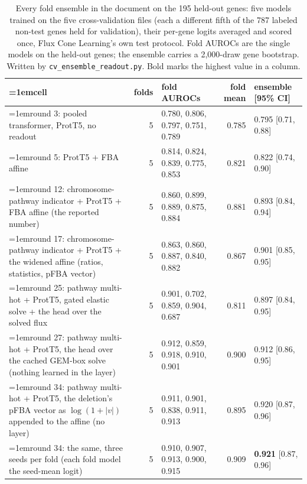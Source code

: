 \begin{table}[H]
  \centering
  \footnotesize
  \setlength{\tabcolsep}{2.5pt}
  \caption[Fold ensembles]{Every fold ensemble in the document on the 195 held-out genes: five models trained on the five cross-validation files (each a different fifth of the 787 labeled non-test genes held for validation), their per-gene logits averaged and scored once, Flux Cone Learning's own test protocol. Fold AUROCs are the single models on the held-out genes; the ensemble carries a 2,000-draw gene bootstrap. Written by \texttt{cv\_ensemble\_readout.py}. Bold marks the highest value in a column.}
  \label{tab:ensembles}
  \begin{tabular}{@{}>{\raggedright\hangindent=1em\hangafter=1\arraybackslash}p{88.6mm}rlrl@{}}
    \hline
    cell & folds & fold AUROCs & fold mean & ensemble [95\% CI] \\
    \hline
    round 3: pooled transformer, ProtT5, no readout & 5 & 0.780, 0.806, 0.797, 0.751, 0.789 & 0.785 & 0.795 [0.71, 0.88] \\
    round 5: ProtT5 + FBA affine & 5 & 0.814, 0.824, 0.839, 0.775, 0.853 & 0.821 & 0.822 [0.74, 0.90] \\
    round 12: chromosome-pathway indicator + ProtT5 + FBA affine (the reported number) & 5 & 0.860, 0.899, 0.889, 0.875, 0.884 & 0.881 & 0.893 [0.84, 0.94] \\
    round 17: chromosome-pathway indicator + ProtT5 + the widened affine (ratios, statistics, pFBA vector) & 5 & 0.863, 0.860, 0.887, 0.840, 0.882 & 0.867 & 0.901 [0.85, 0.95] \\
    round 25: pathway multi-hot + ProtT5, gated elastic solve + the head over the solved flux & 5 & 0.901, 0.702, 0.859, 0.904, 0.687 & 0.811 & 0.897 [0.84, 0.95] \\
    round 27: pathway multi-hot + ProtT5, the head over the cached GEM-box solve (nothing learned in the layer) & 5 & 0.912, 0.859, 0.918, 0.910, 0.901 & 0.900 & 0.912 [0.86, 0.95] \\
    round 34: pathway multi-hot + ProtT5, the deletion's pFBA vector as $\log(1 + |v|)$ appended to the affine (no layer) & 5 & 0.911, 0.901, 0.838, 0.911, 0.913 & 0.895 & 0.920 [0.87, 0.96] \\
    round 34: the same, three seeds per fold (each fold model the seed-mean logit) & 5 & 0.910, 0.907, 0.913, 0.900, 0.915 & 0.909 & \textbf{0.921} [0.87, 0.96] \\

\end{tabular}
\end{table}
